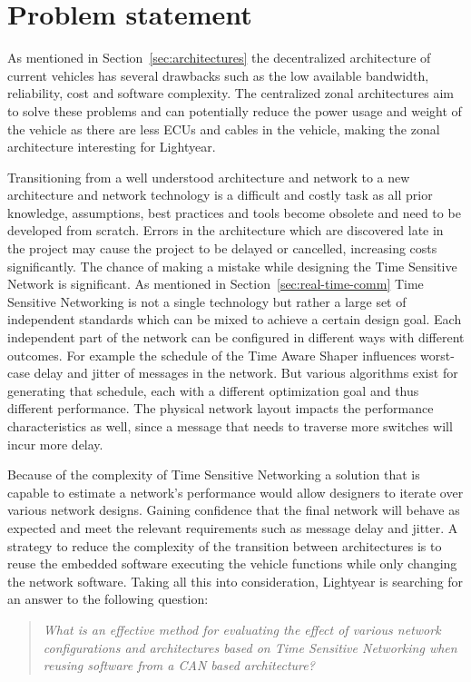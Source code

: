 \section{Problem statement}
\label{sec:problem_statement}
As mentioned in Section~\ref{sec:architectures} the decentralized architecture of current vehicles has several drawbacks such as the low available bandwidth, reliability, cost and software complexity. The centralized zonal architectures aim to solve these problems and can potentially reduce the power usage and weight of the vehicle as there are less ECUs and cables in the vehicle, making the zonal architecture interesting for Lightyear.

Transitioning from a well understood architecture and network to a new architecture and network technology is a difficult and costly task as all prior knowledge, assumptions, best practices and tools become obsolete and need to be developed from scratch. Errors in the architecture which are discovered late in the project may cause the project to be delayed or cancelled, increasing costs significantly. The chance of making a mistake while designing the Time Sensitive Network is significant. As mentioned in Section~\ref{sec:real-time-comm} Time Sensitive Networking is not a single technology but rather a large set of independent standards which can be mixed to achieve a certain design goal. Each independent part of the network can be configured in different ways with different outcomes. For example the schedule of the Time Aware Shaper influences worst-case delay and jitter of messages in the network. But various algorithms exist for generating that schedule, each with a different optimization goal and thus different performance. The physical network layout impacts the performance characteristics as well, since a message that needs to traverse more switches will incur more delay.

Because of the complexity of Time Sensitive Networking a solution that is capable to estimate a network's performance would allow designers to iterate over various network designs. Gaining confidence that the final network will behave as expected and meet the relevant requirements such as message delay and jitter. A strategy to reduce the complexity of the transition between architectures is to reuse the embedded software executing the vehicle functions while only changing the network software. Taking all this into consideration, Lightyear is searching for an answer to the following question:

\begin{quote}
    \emph{What is an effective method for evaluating the effect of various network configurations and architectures based on Time Sensitive Networking when reusing software from a CAN based architecture?}
\end{quote}

